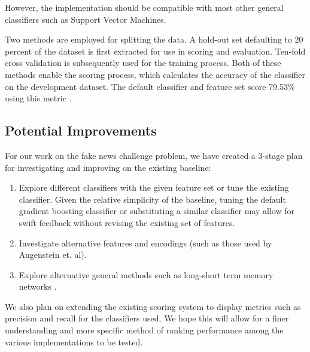 \documentclass[11pt,a4paper]{article}
\begin{document}
However, the implementation should be compatible with most other general classifiers such as Support Vector Machines. 

Two methods are employed for splitting the data. A hold-out set defaulting to 20 percent of the dataset is first extracted for use in scoring and evaluation. Ten-fold cross validation is subsequently used for the training process. Both of these methods enable the scoring process, which calculates the accuracy of the classifier on the development dataset. The default classifier and feature set score 79.53\% using this metric \cite{fncbaselinegithub}.


\subsection{Potential Improvements} 

For our work on the fake news challenge problem, we have created a 3-stage plan for investigating and improving on the existing baseline:

\begin{enumerate}
	\item Explore different classifiers with the given feature set or tune the existing classifier. Given the relative simplicity of the baseline, tuning the default gradient boosting classifier or substituting a similar classifier may allow for swift feedback without revising the existing set of features.
	\item Investigate alternative features and encodings (such as those used by Augenstein et. al). 
	\item Explore alternative general methods such as long-short term memory networks \cite{augenstein2016stance}. 
\end{enumerate}

We also plan on extending the existing scoring system to display metrics such as precision and recall for the classifiers used. We hope this will allow for a finer understanding and more specific method of ranking performance among the various implementations to be tested.





%
%


\end{document}
